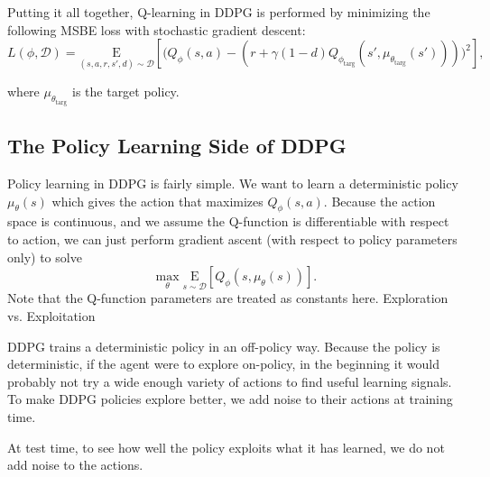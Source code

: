 Putting it all together, Q-learning in DDPG is performed by minimizing the following MSBE loss with stochastic gradient descent:
\begin{equation}
L(\phi, {\mathcal D}) = \underset{(s,a,r,s',d) \sim {\mathcal D}}{{\mathrm E}}\left[
    \Bigg( Q_{\phi}(s,a) - \left(r + \gamma (1 - d) Q_{\phi_{\text{targ}}}(s', \mu_{\theta_{\text{targ}}}(s')) \right) \Bigg)^2
    \right],
\end{equation}

where $\mu_{\theta_{\text{targ}}}$ is the target policy.

\subsection{The Policy Learning Side of DDPG}

Policy learning in DDPG is fairly simple. We want to learn a deterministic policy $\mu_{\theta}(s)$ which gives the action that maximizes $Q_{\phi}(s,a)$. Because the action space is continuous, and we assume the Q-function is differentiable with respect to action, we can just perform gradient ascent (with respect to policy parameters only) to solve
\begin{equation}
\max_{\theta} \underset{s \sim {\mathcal D}}{{\mathrm E}}\left[ Q_{\phi}(s, \mu_{\theta}(s)) \right].
\end{equation}
Note that the Q-function parameters are treated as constants here.
Exploration vs. Exploitation

DDPG trains a deterministic policy in an off-policy way. Because the policy is deterministic, if the agent were to explore on-policy, in the beginning it would probably not try a wide enough variety of actions to find useful learning signals. To make DDPG policies explore better, we add noise to their actions at training time.

At test time, to see how well the policy exploits what it has learned, we do not add noise to the actions.